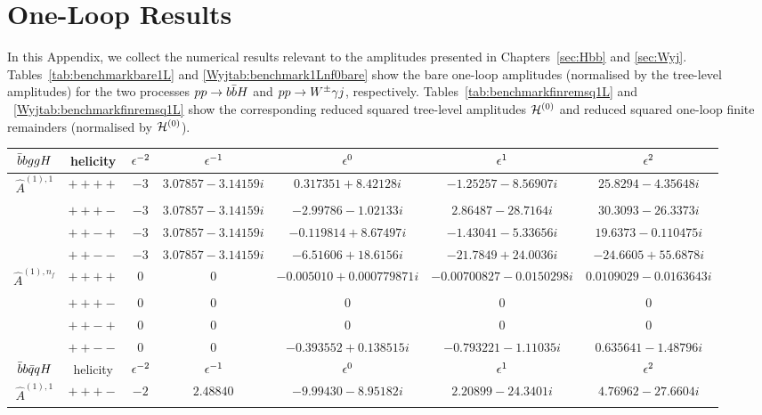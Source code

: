 \documentclass[main.tex]{subfiles}
\begin{document}
\renewcommand{\theequation}{E.\arabic{equation}}
\chapter{One-Loop Results}
\label{app:oneloop}
In this Appendix, we collect the numerical results relevant to the amplitudes presented in Chapters~\ref{sec:Hbb} and \ref{sec:Wyj}. Tables~\ref{tab:benchmarkbare1L} and \ref{Wyjtab:benchmark1Lnf0bare} show the bare one-loop amplitudes (normalised by the tree-level amplitudes) for the two processes $pp \rightarrow b\bar{b}H$ and $pp \rightarrow W^\pm \gamma j$, respectively. Tables~\ref{tab:benchmarkfinremsq1L} and ~\ref{Wyjtab:benchmarkfinremsq1L} show the corresponding reduced squared tree-level amplitudes $\mathcal{H}^{(0)}$ and reduced squared one-loop finite remainders (normalised by $\mathcal{H}^{(0)}$).
\begin{table}[t!]
\centering
\begin{tabularx}{1.0\textwidth}{|C{0.7}|C{0.8}|C{0.5}|C{1.2}|C{1.2}|C{1.3}|C{1.3}|}
\hline
 $\bar{b}bggH$     & helicity & $\epsilon^{-2}$ & $\epsilon^{-1}$ & $\epsilon^{0}$ & $\epsilon^{1}$ & $\epsilon^{2}$ \\
\hline
$\hat A^{(1),1}$ & $++++$ & $ -3 $ & $ 3.07857 - 3.14159 i$ & $ 0.317351 + 8.42128 i$ & $ -1.25257 - 8.56907 i$ & $ 25.8294 - 4.35648 i $ \\
                 & $+++-$ & $ -3 $ & $ 3.07857 - 3.14159 i$ & $ -2.99786 - 1.02133 i$ & $ 2.86487 - 28.7164 i$ & $ 30.3093 - 26.3373 i $ \\
                 & $++-+$ & $ -3 $ & $ 3.07857 - 3.14159 i$ & $ -0.119814 + 8.67497 i$ & $ -1.43041 - 5.33656 i$ & $ 19.6373 - 0.110475 i $ \\
                 & $++--$ & $ -3 $ & $ 3.07857 - 3.14159 i$ & $ -6.51606 + 18.6156 i$ & $ -21.7849 + 24.0036 i$ & $ -24.6605 + 55.6878 i $ \\
\hline
$\hat A^{(1),n_f}$ & $++++$ & $ 0$ & $ 0$ & $ -0.005010 + 0.000779871 i$ & $ -0.00700827 - 0.0150298 i$ & $ 0.0109029 - 0.0163643 i $ \\
                   & $+++-$ & $ 0$ & $ 0$ & $ 0$ & $ 0$ & $ 0 $ \\
                   & $++-+$ & $ 0$ & $ 0$ & $ 0$ & $ 0$ & $ 0 $ \\
                   & $++--$ & $ 0$ & $ 0$ & $ -0.393552 + 0.138515 i$ & $ -0.793221 - 1.11035 i$ & $ 0.635641 - 1.48796 i $ \\
\hline
$\bar{b}b\bar{q}qH$     & helicity & $\epsilon^{-2}$ & $\epsilon^{-1}$ & $\epsilon^{0}$ & $\epsilon^{1}$ & $\epsilon^{2}$ \\
\hline
$\hat A^{(1),1}$ & $+++-$ & $ -2 $ & $ 2.48840$ & $ -9.99430 - 8.95182 i$ & $ 2.20899 - 24.3401 i$ & $ 4.76962 - 27.6604 i $ \\

\end{tabularx}
\end{table}
\end{document}
